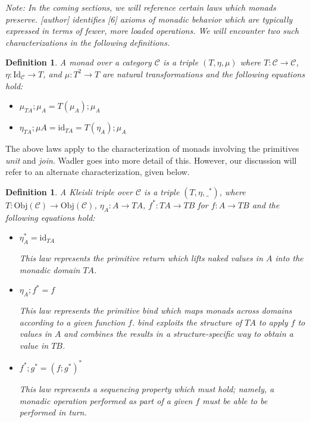 \documentclass[ms]{byuprop}
\newcounter{definition}
\begin{document}
\emph{Note: In the coming sections, we will reference certain laws which monads preserve.
[author] identifies [6] axioms of monadic behavior which are typically expressed in terms
of fewer, more loaded operations. We will encounter two such characterizations in the
following definitions.}

\newtheorem{monad}[definition]{Definition}

\begin{monad}
A \emph{monad} over a category $\mathcal{C}$ is a triple $(T,\eta,\mu)$ where
$T:\mathcal{C}\rightarrow\mathcal{C}$, $\eta:\mathrm{Id}_{\mathcal{C}}\rightarrow T$, and
$\mu:T^{2}\rightarrow T$ are \emph{natural transformations} and the following equations
hold:

\begin{itemize}
\item $\mu_{TA};\mu_{A}=T(\mu_{A});\mu_{A}$
\item $\eta_{TA};\mu{A}=\mathrm{id}_{TA}=T(\eta_{A});\mu_{A}$
\end{itemize}
\end{monad}

The above laws apply to the characterization of monads involving the primitives
\emph{unit} and \emph{join}. Wadler \cite{wadler1995monads} goes into more detail of this.
However, our discussion will refer to an alternate characterization, given below.

\newtheorem{kleisli}[definition]{Definition}

\begin{kleisli}
A \emph{Kleisli triple} over $\mathcal{C}$ is a triple $(T,\eta,\_^{*})$, where
$T:\mathrm{Obj}(\mathcal{C})\rightarrow \mathrm{Obj}(\mathcal{C})$, $\eta_{A}:A\rightarrow TA$,
$f^{*}:TA\rightarrow TB$ for $f:A\rightarrow TB$ and the following equations hold:

\begin{itemize}
\item $\eta_{A}^{*}=\mathrm{id}_{TA}$

This law represents the primitive \emph{return} which lifts naked values in $A$ into the monadic domain $TA$.

\item $\eta_{A};f^{*}=f$

This law represents the primitive \emph{bind} which maps monads across domains according to a given function $f$. \emph{bind} exploits the structure of $TA$ to apply $f$ to values in $A$ and combines the results in a structure-specific way to obtain a value in $TB$.

\item $f^{*};g^{*}=(f;g^{*})^{*}$

This law represents a sequencing property which must hold; namely, a monadic operation performed as part of a given $f$ must be able to be performed in turn.
\end{itemize}
\end{kleisli}
\end{document}
